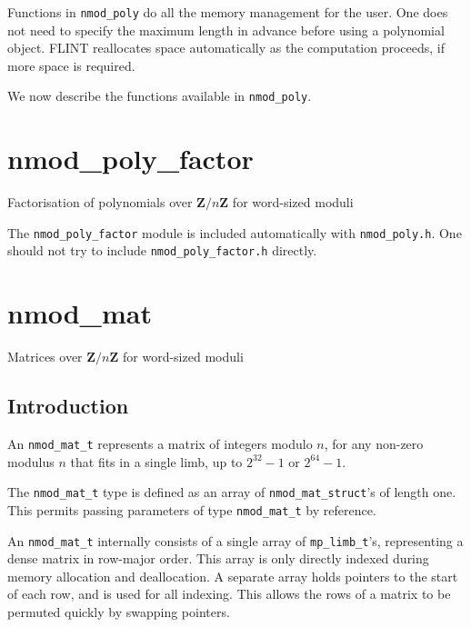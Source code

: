 \documentclass[a4paper,10pt]{book}
\newcommand{\Z}{\mathbf{Z}}%
\newcommand{\code}{\lstinline}
\begin{document}
{{Functions in \code{nmod_poly} do all the memory management for the user.
One does not need to specify the maximum length in advance before using a
polynomial object.  FLINT reallocates space automatically as the computation
proceeds, if more space is required.

We now describe the functions available in \code{nmod_poly}.




\chapter{nmod\_poly\_factor}
\epigraph{Factorisation of polynomials over $\Z / n \Z$ for word-sized moduli}{}

The \code{nmod_poly_factor} module is included automatically with
\code{nmod_poly.h}. One should not try to include \code{nmod_poly_factor.h}
directly.




\chapter{nmod\_mat}
\epigraph{Matrices over $\Z / n \Z$ for word-sized moduli}{}

\section{Introduction}

An \code{nmod_mat_t} represents a matrix of integers modulo $n$, for any
non-zero modulus $n$ that fits in a single limb,
up to $2^{32}-1$ or $2^{64}-1$.

The \code{nmod_mat_t} type is defined as an array of
\code{nmod_mat_struct}'s of length one.
This  permits passing parameters of type \code{nmod_mat_t}
by reference.

An \code{nmod_mat_t} internally consists of a single array of
\code{mp_limb_t}'s, representing a dense matrix in row-major order.
This array is only directly indexed during memory allocation and
deallocation. A separate array holds pointers to the start of each
row, and is used for all indexing. This allows the rows of a matrix
to be permuted quickly by swapping pointers.

}}
\end{document}

